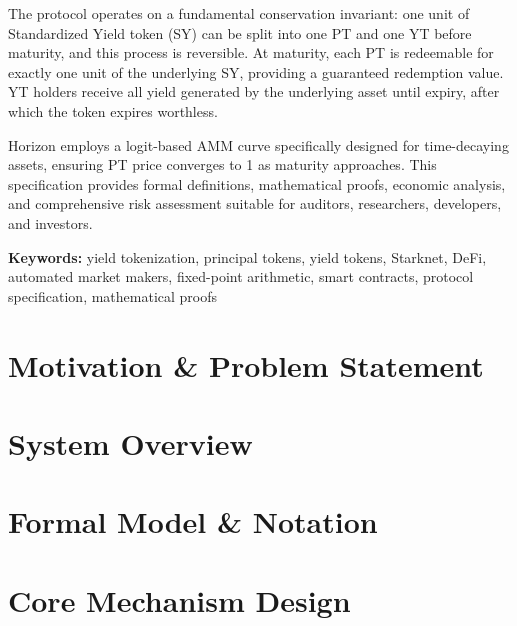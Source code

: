 \documentclass[12pt,a4paper]{report}
\theoremstyle{plain}
\theoremstyle{definition}
\theoremstyle{remark}
\begin{document}
The protocol operates on a fundamental conservation invariant: one unit of Standardized Yield token (SY) can be split into one PT and one YT before maturity, and this process is reversible. At maturity, each PT is redeemable for exactly one unit of the underlying SY, providing a guaranteed redemption value. YT holders receive all yield generated by the underlying asset until expiry, after which the token expires worthless.

Horizon employs a logit-based AMM curve specifically designed for time-decaying assets, ensuring PT price converges to 1 as maturity approaches. This specification provides formal definitions, mathematical proofs, economic analysis, and comprehensive risk assessment suitable for auditors, researchers, developers, and investors.
\normalfont

\vspace{12pt}

\noindent \textbf{Keywords:} yield tokenization, principal tokens, yield tokens, Starknet, DeFi, automated market makers, fixed-point arithmetic, smart contracts, protocol specification, mathematical proofs

\clearpage


\tableofcontents

\clearpage


\chapter{Motivation \& Problem Statement}


\chapter{System Overview}


\chapter{Formal Model \& Notation}


\chapter{Core Mechanism Design}

\end{document}
